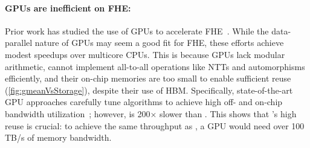 \paragraph{GPUs are inefficient on FHE:}
Prior work has studied the use of GPUs to accelerate FHE~\cite{wang:hpec12:fhe-gpu,wang:tc13:fhe-gpu,wang:iscas14:leveled-gpu,al:emerging19:implementation,jung2021over}.
While the data-parallel nature of GPUs may seem a good fit for FHE, these efforts achieve modest speedups over multicore CPUs.
This is because GPUs lack modular arithmetic, cannot implement all-to-all operations like NTTs and automorphisms efficiently,
and their on-chip memories are too small to enable sufficient reuse (\autoref{fig:gmeanVsStorage}), despite their use of HBM. Specifically, state-of-the-art GPU approaches carefully tune algorithms to achieve high off- and on-chip bandwidth utilization~\cite{jung2021over}; however, \cite{jung2021over} is 200$\times$ slower than \name.
This shows that \name's high reuse is crucial: to achieve the same throughput as \name,
a GPU would need over 100\,TB/s of memory bandwidth.
